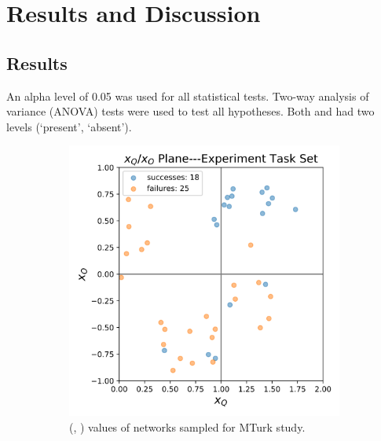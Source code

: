 \section{Results and Discussion} \label{sec:results_discussion}
\subsection{Results} \label{sec:results}
An alpha level of 0.05 was used for all statistical tests. Two-way analysis of variance (ANOVA) tests were used to test all hypotheses. Both \xQ{} and \xO had two levels (`present', `absent').
\begin{figure}[tbp]
    \centering
    \begin{subfigure}[b]{0.30\linewidth}
        \centering
        \includegraphics[width=1.0\linewidth]{Figures/xQxO_plane_experiment_set.png}
        \vfill
        \caption{(\xQ{}, \xO{}) values of networks sampled for MTurk study.}
        \label{fig:exp_set}
    \end{subfigure}%
    \hfill
    \begin{subfigure}[b]{0.30\linewidth}
        \centering

\end{subfigure}
\end{figure}
